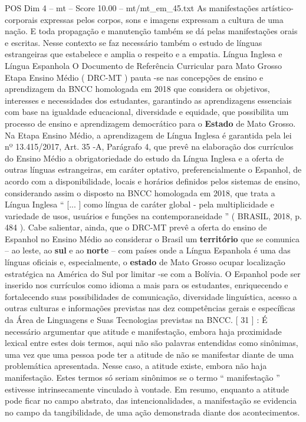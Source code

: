 \begin{textsample}{POS Dim 4 – mt – Score 10.00 – mt/mt\_em\_45.txt}
As manifestações artístico-corporais expressas pelos corpos, sons e imagens expressam a cultura de uma nação.
E toda propagação e manutenção também se dá pelas manifestações orais e escritas.
Nesse contexto se faz necessário também o estudo de línguas estrangeiras que estabelece e amplia o respeito e a empatia.
Língua Inglesa e Língua Espanhola O Documento de Referência Curricular para Mato Grosso Etapa Ensino Médio ( DRC-MT ) pauta -se nas concepções de ensino e aprendizagem da BNCC homologada em 2018 que considera os objetivos, interesses e necessidades dos estudantes, garantindo as aprendizagens essenciais com base na igualdade educacional, diversidade e equidade, que possibilita um processo de ensino e aprendizagem democrático para o \textbf{Estado} de Mato Grosso.
Na Etapa Ensino Médio, a aprendizagem de Língua Inglesa é garantida pela lei nº 13.415/2017, Art. 35 -A, Parágrafo 4, que prevê na elaboração dos currículos do Ensino Médio a obrigatoriedade do estudo da Língua Inglesa e a oferta de outras línguas estrangeiras, em caráter optativo, preferencialmente o Espanhol, de acordo com a disponibilidade, locais e horários definidos pelos sistemas de ensino, considerando assim o disposto na BNCC homologada em 2018, que trata a Língua Inglesa “ [... ] como língua de caráter global - pela multiplicidade e variedade de usos, usuários e funções na contemporaneidade ” ( BRASIL, 2018, p. 484 ).
Cabe salientar, ainda, que o DRC-MT prevê a oferta do ensino de Espanhol no Ensino Médio ao considerar o Brasil um \textbf{território} que se comunica – ao leste, ao \textbf{sul} e ao \textbf{norte} – com países onde a Língua Espanhola é uma das línguas oficiais e, especialmente, o \textbf{estado} de Mato Grosso ocupar localização estratégica na América do Sul por limitar -se com a Bolívia.
O Espanhol pode ser inserido nos currículos como idioma a mais para os estudantes, enriquecendo e fortalecendo suas possibilidades de comunicação, diversidade linguística, acesso a outras culturas e informações previstas nas dez competências gerais e específicas da Área de Linguagens e Suas Tecnologias previstas na BNCC. [ 31 ] : É necessário argumentar que atitude e manifestação, embora haja proximidade lexical entre estes dois termos, aqui não são palavras entendidas como sinônimas, uma vez que uma pessoa pode ter a atitude de não se manifestar diante de uma problemática apresentada.
Nesse caso, a atitude existe, embora não haja manifestação.
Estes termos só seriam sinônimos se o termo “ manifestação ” estivesse intrinsecamente vinculado à vontade.
Em resumo, enquanto a atitude pode ficar no campo abstrato, das intencionalidades, a manifestação se evidencia no campo da tangibilidade, de uma ação demonstrada diante dos acontecimentos.

\end{textsample}
